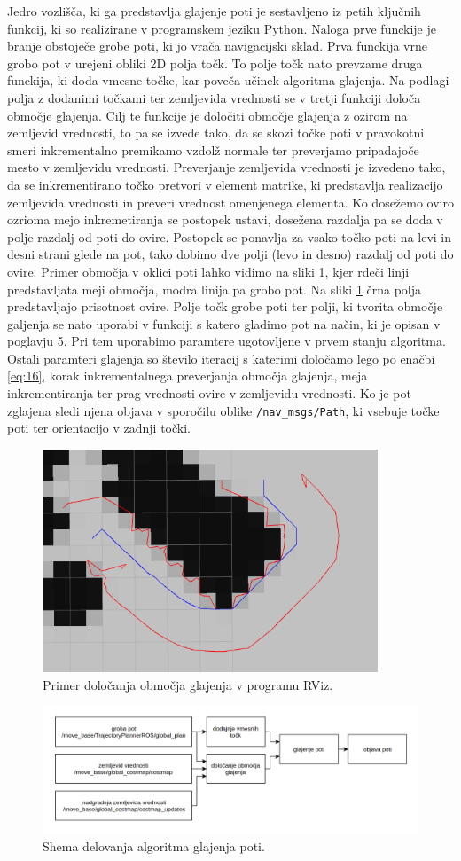 Jedro vozlišča, ki ga predstavlja glajenje poti je sestavljeno iz petih ključnih funkcij, ki so realizirane v programskem jeziku Python. Naloga prve funckije je branje obstoječe grobe poti, ki jo vrača navigacijski sklad. Prva funckija vrne grobo pot v urejeni obliki 2D polja točk. To polje točk nato prevzame druga funckija, ki doda vmesne točke, kar poveča učinek algoritma glajenja. Na podlagi polja z dodanimi točkami ter zemljevida vrednosti se v tretji funkciji določa območje glajenja. Cilj te funkcije je določiti območje glajenja z ozirom na zemljevid vrednosti, to pa se izvede tako, da se skozi točke poti v pravokotni smeri inkrementalno premikamo vzdolž normale ter preverjamo pripadajoče mesto v zemljevidu vrednosti. Preverjanje zemljevida vrednosti je izvedeno tako, da se inkrementirano točko pretvori v element matrike, ki predstavlja realizacijo zemljevida vrednosti in preveri vrednost omenjenega elementa. Ko dosežemo oviro ozrioma mejo inkremetiranja se postopek ustavi, dosežena razdalja pa se doda v polje razdalj od poti do ovire. Postopek se ponavlja za vsako točko poti na levi in desni strani glede na pot, tako dobimo dve polji (levo in desno) razdalj od poti do ovire. Primer območja v oklici poti lahko vidimo na sliki \ref{fig:slika_obm}, kjer rdeči linji predstavljata meji območja, modra linija pa grobo pot. Na sliki \ref{fig:slika_obm} črna polja predstavljajo prisotnost ovire. Polje točk grobe poti ter polji, ki tvorita območje galjenja se nato uporabi v funkciji s katero gladimo pot na način, ki je opisan v poglavju 5. Pri tem uporabimo paramtere ugotovljene v prvem stanju algoritma. Ostali paramteri glajenja so število iteracij s katerimi določamo lego po enačbi \ref{eq:16}, korak inkrementalnega preverjanja območja glajenja, meja inkrementiranja ter prag vrednosti ovire v zemljevidu vrednosti. Ko je pot zglajena sledi njena objava v sporočilu oblike \verb|/nav_msgs/Path|, ki vsebuje točke poti ter orientacijo v zadnji točki.

\begin{figure}[H]
	\centering
	\includegraphics[width=10cm]{pic/obmocje.png}
	\caption{Primer določanja območja glajenja v programu RViz.}
	\label{fig:slika_obm}
\end{figure}


\begin{figure}[H]
	\centering
	\includegraphics[width=16cm]{pic/shema.png}
	\caption{Shema delovanja algoritma glajenja poti.}
	\label{fig:slika6}
\end{figure}
